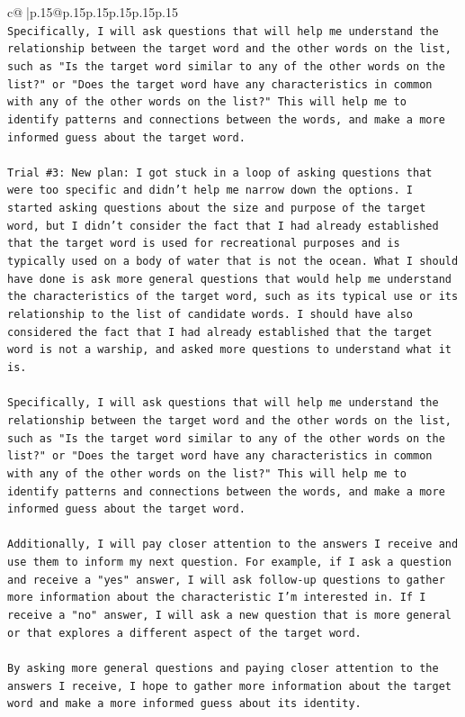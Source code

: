 \documentclass{article}
\begin{document}
{\begin{supertabular}{c@{$\;$}|p{.15\linewidth}@{}p{.15\linewidth}p{.15\linewidth}p{.15\linewidth}p{.15\linewidth}p{.15\linewidth}}
{{{\\ 
\texttt{Specifically, I will ask questions that will help me understand the relationship between the target word and the other words on the list, such as "Is the target word similar to any of the other words on the list?" or "Does the target word have any characteristics in common with any of the other words on the list?" This will help me to identify patterns and connections between the words, and make a more informed guess about the target word.} \\
\\ 
\texttt{Trial \#3: New plan: I got stuck in a loop of asking questions that were too specific and didn't help me narrow down the options. I started asking questions about the size and purpose of the target word, but I didn't consider the fact that I had already established that the target word is used for recreational purposes and is typically used on a body of water that is not the ocean. What I should have done is ask more general questions that would help me understand the characteristics of the target word, such as its typical use or its relationship to the list of candidate words. I should have also considered the fact that I had already established that the target word is not a warship, and asked more questions to understand what it is.} \\
\\ 
\texttt{Specifically, I will ask questions that will help me understand the relationship between the target word and the other words on the list, such as "Is the target word similar to any of the other words on the list?" or "Does the target word have any characteristics in common with any of the other words on the list?" This will help me to identify patterns and connections between the words, and make a more informed guess about the target word.} \\
\\ 
\texttt{Additionally, I will pay closer attention to the answers I receive and use them to inform my next question. For example, if I ask a question and receive a "yes" answer, I will ask follow{-}up questions to gather more information about the characteristic I'm interested in. If I receive a "no" answer, I will ask a new question that is more general or that explores a different aspect of the target word.} \\
\\ 
\texttt{By asking more general questions and paying closer attention to the answers I receive, I hope to gather more information about the target word and make a more informed guess about its identity.} \\
}}}
\end{supertabular}}
\end{document}
